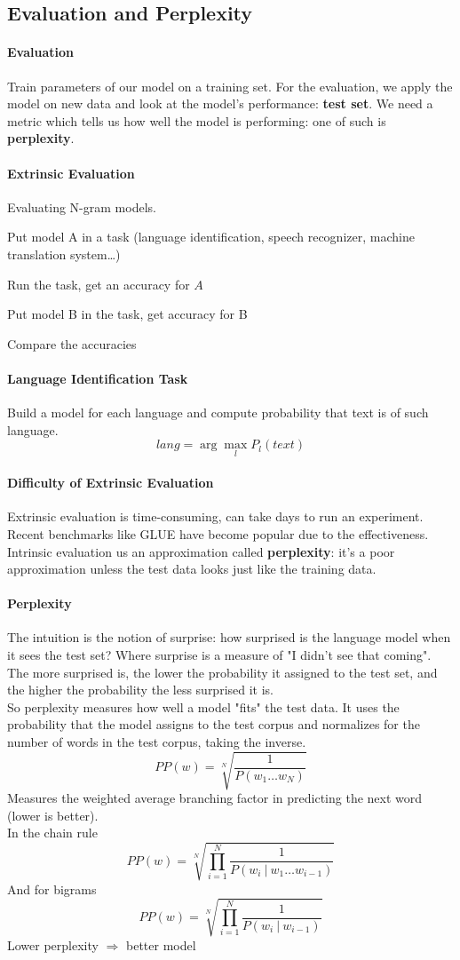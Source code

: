 \documentclass[10pt]{report}
\begin{document}
\subsection{Evaluation and Perplexity}
\paragraph{Evaluation} Train parameters of our model on a training set. For the evaluation, we apply the model on new data and look at the model's performance: \textbf{test set}. We need a metric which tells us how well the model is performing: one of such is \textbf{perplexity}.
\paragraph{Extrinsic Evaluation} Evaluating N-gram models.\begin{list}{}{}
	\item Put model A in a task (language identification, speech recognizer, machine translation system\ldots)
	\item Run the task, get an accuracy for $A$
	\item Put model B in the task, get accuracy for B
	\item Compare the accuracies
\end{list}
\paragraph{Language Identification Task} Build a model for each language and compute probability that text is of such language.
$$lang = \arg\max_l P_l(text)$$
\paragraph{Difficulty of Extrinsic Evaluation} Extrinsic evaluation is time-consuming, can take days to run an experiment. Recent benchmarks like GLUE have become popular due to the effectiveness.\\
Intrinsic evaluation us an approximation called \textbf{perplexity}: it's a poor approximation unless the test data looks just like the training data.
\paragraph{Perplexity} The intuition is the notion of surprise: how surprised is the language model when it sees the test set? Where surprise is a measure of "I didn't see that coming". The more surprised is, the lower the probability it assigned to the test set, and the higher the probability the less surprised it is.\\
So perplexity measures how well a model "fits" the test data. It uses the probability that the model assigns to the test corpus and normalizes for the number of words in the test corpus, taking the inverse. $$PP(w) = \sqrt[N]{\frac{1}{P(w_1\ldots w_N)}}$$
Measures the weighted average branching factor in predicting the next word (lower is better).\\
In the chain rule $$PP(w) = \sqrt[N]{\prod_{i=1}^N\frac{1}{P(w_i\:|\:w_1\ldots w_{i-1})}}$$
And for bigrams $$PP(w) = \sqrt[N]{\prod_{i=1}^N\frac{1}{P(w_i\:|\:w_{i-1})}}$$
Lower perplexity $\Rightarrow$ better model
\end{document}
